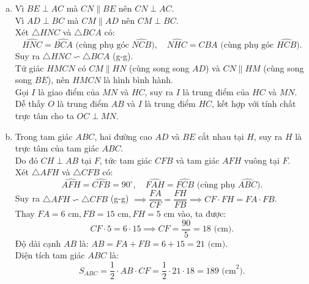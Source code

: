 \begin{bt}
{\begin{enumerate}[a)]
    Suy ra $4$ điểm $C, E, H, D$ cùng thuộc đường tròn đường kính $CH$.\\
    Vậy tứ giác $CEHD$ nội tiếp đường tròn đường kính $CH$.
    \item Vì $BE \perp AC$ mà $CN \parallel BE$ nên $CN \perp AC$.\\
    Vì $AD \perp BC$ mà $CM \parallel AD$ nên $CM \perp BC$.\\
    Xét $\triangle HNC$ và $\triangle BCA$ có:
    $$\widehat{HNC} = \widehat{BCA}\text{ (cùng phụ góc } \widehat{NCB}\text{)}, \quad \widehat{NHC} = \widehat{CBA}\text{ (cùng phụ góc } \widehat{HCB}\text{)}.$$
    Suy ra $\triangle HNC \backsim \triangle BCA$ (g-g).\\
    Tứ giác $HMCN$ có $CM \parallel HN$ (cùng song song $AD$) và $CN \parallel HM$ (cùng song song $BE$), nên $HMCN$ là hình bình hành.\\
    Gọi $I$ là giao điểm của $MN$ và $HC$, suy ra $I$ là trung điểm của $HC$ và $MN$.\\
    Dễ thấy $O$ là trung điểm $AB$ và $I$ là trung điểm $HC$, kết hợp với tính chất trực tâm cho ta $OC \perp MN$.
    \item Trong tam giác $ABC$, hai đường cao $AD$ và $BE$ cắt nhau tại $H$, suy ra $H$ là trực tâm của tam giác $ABC$.\\
    Do đó $CH \perp AB$ tại $F$, tức tam giác $CFB$ và tam giác $AFH$ vuông tại $F$.\\
    Xét $\triangle AFH$ và $\triangle CFB$ có:
    $$\widehat{AFH} = \widehat{CFB} = 90^\circ, \quad \widehat{FAH} = \widehat{FCB}\text{ (cùng phụ } \widehat{ABC}\text{)}.$$
    Suy ra $\triangle AFH \backsim \triangle CFB$ (g-g) $\implies \dfrac{FA}{CF} = \dfrac{FH}{FB} \implies CF \cdot FH = FA \cdot FB$.\\
    Thay $FA = 6\text{ cm}, FB = 15\text{ cm}, FH = 5\text{ cm}$ vào, ta được:
    $$CF \cdot 5 = 6 \cdot 15 \implies CF = \dfrac{90}{5} = 18\text{ (cm)}.$$
    Độ dài cạnh $AB$ là: $AB = FA + FB = 6 + 15 = 21\text{ (cm)}$.\\
    Diện tích tam giác $ABC$ là:
    $$S_{ABC} = \dfrac{1}{2} \cdot AB \cdot CF = \dfrac{1}{2} \cdot 21 \cdot 18 = 189\text{ (cm}^2\text{)}.$$
\end{enumerate}
}
\end{bt}

